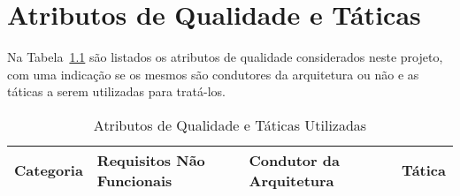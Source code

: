 \chapter{Atributos de Qualidade e Táticas}
\label{sec-atributos}

Na Tabela~\ref{tabela-atributos} são listados os atributos de qualidade considerados neste projeto, com uma indicação se os mesmos são condutores da arquitetura ou não e as táticas a serem utilizadas para tratá-los.

\begin{table}[h]
	\centering	
	\vspace{0.5cm}
	\caption{Atributos de Qualidade e Táticas Utilizadas}	
	\label{tabela-atributos}
	\begin{tabular}{|p{3.5cm}|p{2cm}|p{1.9cm}|p{7cm}|}  \hline 
	
 		Categoria & Requisitos Não Funcionais & Condutor da Arquitetura & Tática \\\hline 
 		
	\end{tabular}
\end{table}
